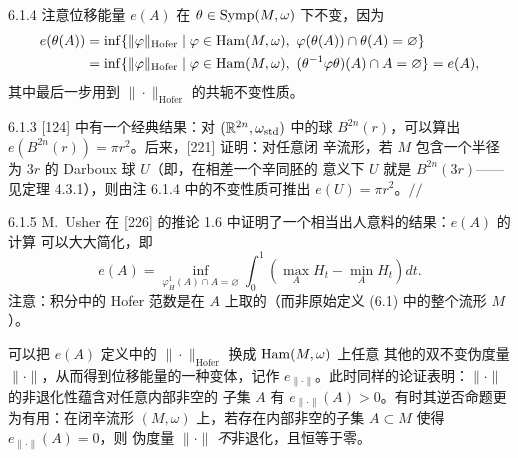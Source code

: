 \begin{wrem}{6.1.4}
  注意位移能量 $e(A)$ 在 $\theta\in\operatorname{Symp}(M,\omega)$ 下不变，因为
  \begin{align*}
    e(\theta(A))
    &=\inf\{\|\varphi\|_{\mathrm{Hofer}}\mid
      \varphi\in\Ham(M,\omega),\ \varphi(\theta(A))\cap\theta(A)=\varnothing\}\\
    &=\inf\{\|\varphi\|_{\mathrm{Hofer}}\mid
      \varphi\in\Ham(M,\omega),\ (\theta^{-1}\varphi\theta)(A)\cap A=\varnothing\}
      =e(A),
  \end{align*}
  其中最后一步用到 $\|\cdot\|_{\mathrm{Hofer}}$ 的共轭不变性质。
\end{wrem}

\begin{wexam}{6.1.3}
  [124] 中有一个经典结果：对 $(\mathbb{R}^{2n},\omega_{\mathrm{std}})$ 中的球
  $B^{2n}(r)$，可以算出 $e(B^{2n}(r))=\pi r^2$。后来，[221] 证明：对任意闭
  辛流形，若 $M$ 包含一个半径为 $3r$ 的 Darboux 球 $U$（即，在相差一个辛同胚的
  意义下 $U$ 就是 $B^{2n}(3r)$——见定理 4.3.1），则由注 6.1.4 中的不变性质可推出
  $e(U)=\pi r^2$。\hfill$//$
\end{wexam}


\begin{wrem}{6.1.5}
  M.~Usher 在 [226] 的推论 1.6 中证明了一个相当出人意料的结果：$e(A)$ 的计算
  可以大大简化，即
  \[
    e(A)=\inf_{\varphi_H^1(A)\cap A=\varnothing}
    \int_0^1\left(\max_A H_t-\min_A H_t\right)dt.
  \]
  注意：积分中的 Hofer 范数是在 $A$ 上取的（而非原始定义 (6.1) 中的整个流形 $M$）。
\end{wrem}


可以把 $e(A)$ 定义中的 $\|\cdot\|_{\mathrm{Hofer}}$ 换成 $\operatorname{Ham}(M,\omega)$ 上任意
其他的双不变伪度量 $\|\cdot\|$，从而得到位移能量的一种变体，记作
$e_{\|\cdot\|}$。此时同样的论证表明：$\|\cdot\|$ 的非退化性蕴含对任意内部非空的
子集 $A$ 有 $e_{\|\cdot\|}(A)>0$。有时其逆否命题更为有用：在闭辛流形
$(M,\omega)$ 上，若存在内部非空的子集 $A\subset M$ 使得 $e_{\|\cdot\|}(A)=0$，则
伪度量 $\|\cdot\|$ \emph{不}非退化，且恒等于零。

